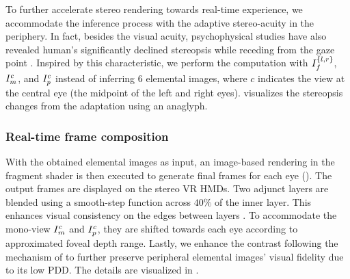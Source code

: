 To further accelerate stereo rendering towards real-time experience, we accommodate the inference process with the adaptive stereo-acuity in the periphery.
In fact, besides the visual acuity, psychophysical studies have also revealed human's significantly declined stereopsis while receding from the gaze point \cite{mochizuki2012magnitude}. Inspired by this characteristic, we perform the computation with $I_{f}^{\{l,r\}}$, $I_{m}^c$, and $I_{p}^c$ instead of inferring $6$ elemental images, where $c$ indicates the view at the central eye (the midpoint of the left and right eyes).  visualizes the stereopsis changes from the adaptation using an anaglyph. 

\subsubsection{Real-time frame composition}%

With the obtained elemental images as input, an image-based rendering in the fragment shader is then executed to generate final frames for each eye ().
The output frames are displayed on the stereo VR HMDs.
{
Two adjunct layers are blended using a smooth-step function across $40\%$ of the inner layer.
This enhances visual consistency on the edges between layers \cite{Guenter:2012:F3G}.
}
To accommodate the mono-view $I_{m}^c$ and $I_{p}^c$, they are shifted towards each eye according to approximated foveal depth range.
Lastly, we enhance the contrast following the mechanism of \cite{Patney:2016:TFR} to further preserve peripheral elemental images' visual fidelity due to its low PDD. The details are visualized in . %

